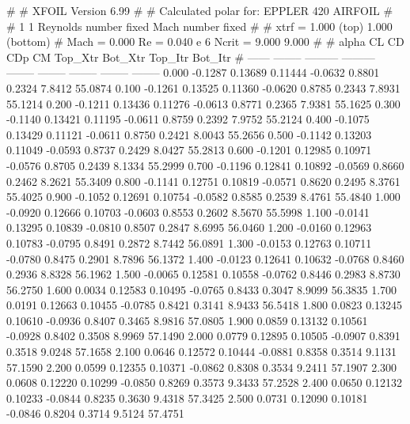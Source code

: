 #  
#       XFOIL         Version 6.99
#  
# Calculated polar for: EPPLER 420 AIRFOIL                              
#  
# 1 1 Reynolds number fixed          Mach number fixed         
#  
# xtrf =   1.000 (top)        1.000 (bottom)  
# Mach =   0.000     Re =     0.040 e 6     Ncrit =   9.000  9.000
#  
#   alpha    CL        CD       CDp       CM     Top_Xtr  Bot_Xtr  Top_Itr  Bot_Itr
#  ------ -------- --------- --------- -------- -------- -------- -------- --------
   0.000  -0.1287   0.13689   0.11444  -0.0632   0.8801   0.2324   7.8412  55.0874
   0.100  -0.1261   0.13525   0.11360  -0.0620   0.8785   0.2343   7.8931  55.1214
   0.200  -0.1211   0.13436   0.11276  -0.0613   0.8771   0.2365   7.9381  55.1625
   0.300  -0.1140   0.13421   0.11195  -0.0611   0.8759   0.2392   7.9752  55.2124
   0.400  -0.1075   0.13429   0.11121  -0.0611   0.8750   0.2421   8.0043  55.2656
   0.500  -0.1142   0.13203   0.11049  -0.0593   0.8737   0.2429   8.0427  55.2813
   0.600  -0.1201   0.12985   0.10971  -0.0576   0.8705   0.2439   8.1334  55.2999
   0.700  -0.1196   0.12841   0.10892  -0.0569   0.8660   0.2462   8.2621  55.3409
   0.800  -0.1141   0.12751   0.10819  -0.0571   0.8620   0.2495   8.3761  55.4025
   0.900  -0.1052   0.12691   0.10754  -0.0582   0.8585   0.2539   8.4761  55.4840
   1.000  -0.0920   0.12666   0.10703  -0.0603   0.8553   0.2602   8.5670  55.5998
   1.100  -0.0141   0.13295   0.10839  -0.0810   0.8507   0.2847   8.6995  56.0460
   1.200  -0.0160   0.12963   0.10783  -0.0795   0.8491   0.2872   8.7442  56.0891
   1.300  -0.0153   0.12763   0.10711  -0.0780   0.8475   0.2901   8.7896  56.1372
   1.400  -0.0123   0.12641   0.10632  -0.0768   0.8460   0.2936   8.8328  56.1962
   1.500  -0.0065   0.12581   0.10558  -0.0762   0.8446   0.2983   8.8730  56.2750
   1.600   0.0034   0.12583   0.10495  -0.0765   0.8433   0.3047   8.9099  56.3835
   1.700   0.0191   0.12663   0.10455  -0.0785   0.8421   0.3141   8.9433  56.5418
   1.800   0.0823   0.13245   0.10610  -0.0936   0.8407   0.3465   8.9816  57.0805
   1.900   0.0859   0.13132   0.10561  -0.0928   0.8402   0.3508   8.9969  57.1490
   2.000   0.0779   0.12895   0.10505  -0.0907   0.8391   0.3518   9.0248  57.1658
   2.100   0.0646   0.12572   0.10444  -0.0881   0.8358   0.3514   9.1131  57.1590
   2.200   0.0599   0.12355   0.10371  -0.0862   0.8308   0.3534   9.2411  57.1907
   2.300   0.0608   0.12220   0.10299  -0.0850   0.8269   0.3573   9.3433  57.2528
   2.400   0.0650   0.12132   0.10233  -0.0844   0.8235   0.3630   9.4318  57.3425
   2.500   0.0731   0.12090   0.10181  -0.0846   0.8204   0.3714   9.5124  57.4751
